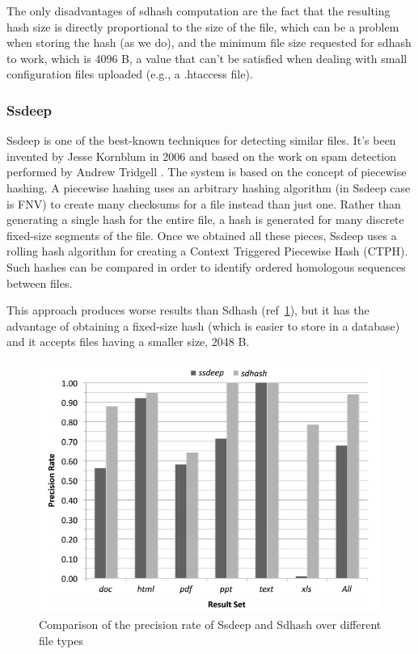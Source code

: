 The only disadvantages of sdhash computation are the fact that the resulting hash size is directly proportional to the size of the file, which can be a problem when storing the hash (as we do), and the minimum file size requested for sdhash to work, which is 4096 B, a value that can't be satisfied when dealing with small configuration files uploaded (e.g., a .htaccess file).

\subsubsection{Ssdeep}
Ssdeep is one of the best-known techniques for detecting similar files. It's been invented by Jesse Kornblum \cite{ssdeep} in 2006 and based on the work on spam detection performed by Andrew Tridgell \cite{spamsum}.
The system is based on the concept of piecewise hashing. A piecewise hashing uses an arbitrary hashing algorithm (in Ssdeep case is FNV) to create many checksums for a file instead than just one. Rather than generating a single hash for the entire file, a hash is generated for many discrete fixed-size segments of the file. Once we obtained all these pieces, Ssdeep uses a rolling hash algorithm for creating a Context Triggered Piecewise Hash (CTPH). Such hashes can be compared in order to identify ordered homologous sequences between files.

This approach produces worse results than Sdhash (ref~\ref{fig:sdhash_ssdeep}), but it has the advantage of obtaining a fixed-size hash (which is easier to store in a database) and it accepts files having a smaller size, 2048 B.

\begin{figure}[tbh]
\centerline{\includegraphics[scale=0.9]{Images/sdhash_ssdeep.jpg}}
\caption{Comparison of the precision rate of Ssdeep and Sdhash over different file types\label{fig:sdhash_ssdeep}}
\end{figure}

